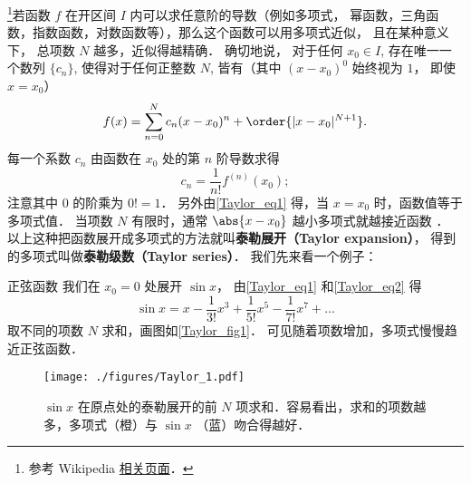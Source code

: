 

\footnote{参考 Wikipedia \href{https://en.wikipedia.org/wiki/Taylor's_theorem}{相关页面}．}若函数 $f$ 在开区间 $I$ 内可以求任意阶的导数（例如多项式， 幂函数，三角函数，指数函数，对数函数等），那么这个函数可以用多项式近似， 且在某种意义下， 总项数 $N$ 越多，近似得越精确． 确切地说， 对于任何 $x_0\in I$, 存在唯一一个数列 $\{c_n\}$, 使得对于任何正整数 $N$, 皆有（其中 $(x-x_0)^0$ 始终视为 $1$， 即使 $x = x_0$）
\begin{equation}\label{Taylor_eq1}
f(x) = \sum_{n = 0}^N  c_n (x - x_0)^n + \order{|x-x_0|^{N+1}}.
\end{equation}
每一个系数 $c_n$ 由函数在 $x_0$ 处的第 $n$ 阶导数求得
\begin{equation}\label{Taylor_eq2}
c_n = \frac{1}{n!} f^{(n)}(x_0);
\end{equation}
注意其中 0 的阶乘为 $0! = 1$． 另外由\autoref{Taylor_eq1} 得，当 $x=x_0$ 时，函数值等于多项式值． 当项数 $N$ 有限时，通常 $\abs{x-x_0}$ 越小多项式就越接近函数 ． 以上这种把函数展开成多项式的方法就叫\textbf{泰勒展开（Taylor expansion）}， 得到的多项式叫做\textbf{泰勒级数（Taylor series）}． 我们先来看一个例子：

\begin{example}{正弦函数}
我们在 $x_0=0$ 处展开 $\sin x$， 由\autoref{Taylor_eq1} 和\autoref{Taylor_eq2} 得
\begin{equation}\label{Taylor_eq3}
\sin x = x - \frac{1}{3!}{x^3} + \frac{1}{5!}{x^5} - \frac{1}{7!} x^7 + \ldots 
\end{equation}
取不同的项数 $N$ 求和，画图如\autoref{Taylor_fig1}． 可见随着项数增加，多项式慢慢趋近正弦函数．

\begin{figure}[ht]
\centering
\texttt{[image: ./figures/Taylor\_1.pdf]}
\caption{$\sin x$ 在原点处的泰勒展开的前 $N$ 项求和．容易看出，求和的项数越多，多项式（橙）与 $\sin x$ （蓝）吻合得越好．}\label{Taylor_fig1}
\end{figure}
\end{example}

